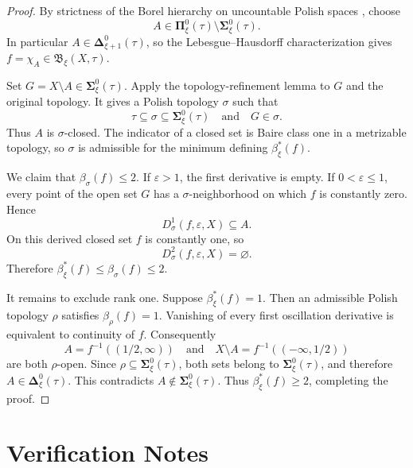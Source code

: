 \documentclass[11pt]{article}
\newcommand{\B}{\mathfrak{B}}
\newcommand{\borelSigma}{\boldsymbol{\Sigma}}
\newcommand{\borelPi}{\boldsymbol{\Pi}}
\newcommand{\borelDelta}{\boldsymbol{\Delta}}
\begin{document}
\begin{proof}
By strictness of the Borel hierarchy on uncountable Polish spaces
\cite[Section 22]{Kechris}, choose
\[
  A\in\borelPi^0_\xi(\tau)\setminus\borelSigma^0_\xi(\tau).
\]
In particular $A\in\borelDelta^0_{\xi+1}(\tau)$, so the
Lebesgue--Hausdorff characterization gives
$f=\chi_A\in\B_\xi(X,\tau)$.

Set $G=X\setminus A\in\borelSigma^0_\xi(\tau)$.  Apply the topology-refinement
lemma \cite[Lemma 3.1]{LNT} to $G$ and the original topology.  It gives a
Polish topology $\sigma$ such that
\[
  \tau\subseteq\sigma\subseteq\borelSigma^0_\xi(\tau)
  \quad\text{and}\quad G\in\sigma.
\]
Thus $A$ is $\sigma$-closed.  The indicator of a closed set is Baire class
one in a metrizable topology, so $\sigma$ is admissible for the minimum
defining $\beta^*_\xi(f)$.

We claim that $\beta_\sigma(f)\leq2$.  If $\varepsilon>1$, the first
derivative is empty.  If $0<\varepsilon\leq1$, every point of the open set
$G$ has a $\sigma$-neighborhood on which $f$ is constantly zero.  Hence
\[
  D_\sigma^1(f,\varepsilon,X)\subseteq A.
\]
On this derived closed set $f$ is constantly one, so
\[
  D_\sigma^2(f,\varepsilon,X)=\varnothing.
\]
Therefore $\beta^*_\xi(f)\leq\beta_\sigma(f)\leq2$.

It remains to exclude rank one.  Suppose $\beta^*_\xi(f)=1$.  Then an
admissible Polish topology $\rho$ satisfies $\beta_\rho(f)=1$.  Vanishing of
every first oscillation derivative is equivalent to continuity of $f$.
Consequently
\[
  A=f^{-1}((1/2,\infty))
  \quad\text{and}\quad
  X\setminus A=f^{-1}(({-}\infty,1/2))
\]
are both $\rho$-open.  Since
$\rho\subseteq\borelSigma^0_\xi(\tau)$, both sets belong to
$\borelSigma^0_\xi(\tau)$, and therefore
$A\in\borelDelta^0_\xi(\tau)$.  This contradicts
$A\notin\borelSigma^0_\xi(\tau)$.  Thus
$\beta^*_\xi(f)\geq2$, completing the proof.
\end{proof}

\section*{Verification Notes}
\end{document}
